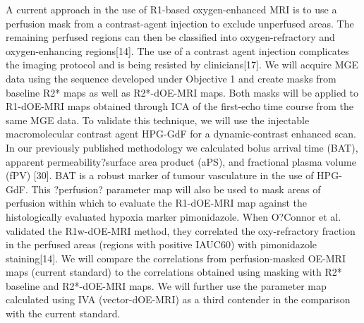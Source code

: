 A current approach in the use of R1-based oxygen-enhanced MRI is to use a perfusion mask from a contrast-agent injection to exclude unperfused areas. The remaining perfused regions can then be classified into oxygen-refractory and oxygen-enhancing regions[14]. The use of a contrast agent injection complicates the imaging protocol and is being resisted by clinicians[17].
We will acquire MGE data using the sequence developed under Objective 1 and create masks from baseline R2* maps as well as R2*-dOE-MRI maps. Both masks will be applied to R1-dOE-MRI maps obtained through ICA of the first-echo time course from the same MGE data. To validate this technique, we will use the injectable macromolecular contrast agent \acs{HPG-GdF} for a dynamic-contrast enhanced scan. In our previously published methodology we calculated bolus arrival time (BAT), apparent permeability?surface area product (aPS), and fractional plasma volume (fPV) [30]. BAT is a robust marker of tumour vasculature in the use of HPG-GdF. This ?perfusion? parameter map will also be used to mask areas of perfusion within which to evaluate the R1-dOE-MRI map against the histologically evaluated hypoxia marker pimonidazole. When O?Connor et al. validated the R1w-dOE-MRI method, they correlated the oxy-refractory fraction in the perfused areas (regions with positive IAUC60) with pimonidazole staining[14]. We will compare the correlations from perfusion-masked OE-MRI maps (current standard) to the correlations obtained using masking with R2* baseline and R2*-dOE-MRI maps. We will further use the parameter map calculated using IVA (vector-dOE-MRI) as a third contender in the comparison with the current standard.












\endinput